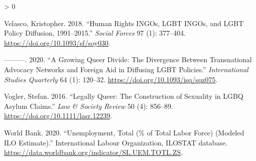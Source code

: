 \documentclass[
  11pt,
]{article}
\newlength{\cslhangindent}
\newenvironment{CSLReferences}[2] %
 {%
  \setlength{\parindent}{0pt}
  \ifodd #1 \everypar{\setlength{\hangindent}{\cslhangindent}}\ignorespaces\fi
  \ifnum #2 > 0
  \setlength{\parskip}{#2\baselineskip}
  \fi
 }%
 {}
\begin{document}
\begin{CSLReferences}{1}{0}
\leavevmode\hypertarget{ref-velasco_2018}{}%
Velasco, Kristopher. 2018. {``Human {Rights} {INGOs}, {LGBT} {INGOs}, and {LGBT} {Policy} {Diffusion}, 1991--2015.''} \emph{Social Forces} 97 (1): 377--404. \url{https://doi.org/10.1093/sf/soy030}.

\leavevmode\hypertarget{ref-velasco_2020}{}%
---------. 2020. {``A {Growing} {Queer} {Divide}: {The} {Divergence} Between {Transnational} {Advocacy} {Networks} and {Foreign} {Aid} in {Diffusing} {LGBT} {Policies}.''} \emph{International Studies Quarterly} 64 (1): 120--32. \url{https://doi.org/10.1093/isq/sqz075}.

\leavevmode\hypertarget{ref-vogler_2016}{}%
Vogler, Stefan. 2016. {``Legally {Queer}: {The} {Construction} of {Sexuality} in {LGBQ} {Asylum} {Claims}.''} \emph{Law \& Society Review} 50 (4): 856--89. \url{https://doi.org/10.1111/lasr.12239}.

\leavevmode\hypertarget{ref-worldbank_2020}{}%
World Bank. 2020. {``Unemployment, Total (\% of Total Labor Force) (Modeled {ILO} Estimate).''} International Labour Organization, ILOSTAT database. \url{https://data.worldbank.org/indicator/SL.UEM.TOTL.ZS}.

\end{CSLReferences}
\end{document}
